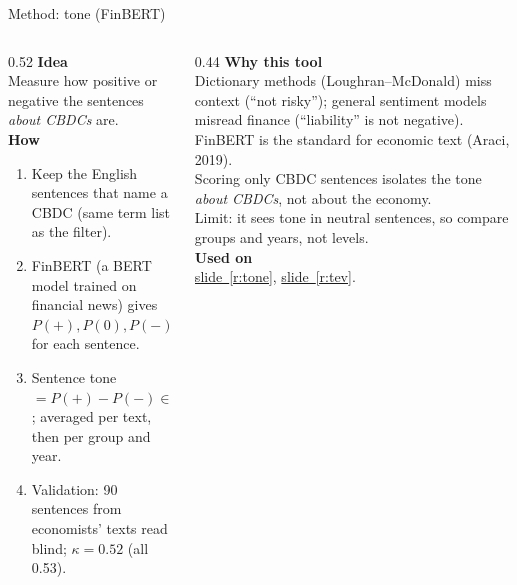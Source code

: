 \documentclass[aspectratio=169,10pt]{beamer}
\newcommand{\usedon}[1]{\hyperref[#1]{\textcolor{c4}{slide~\ref*{#1}}}}
\newcommand{\mhead}[1]{\textcolor{c1}{\textbf{#1}}\\[1pt]}
\begin{document}
\begin{frame}{Method: tone (FinBERT)}
\begin{columns}[T]
\begin{column}{0.52\textwidth}\footnotesize
\mhead{Idea}
Measure how positive or negative the sentences \emph{about CBDCs} are.\\[4pt]
\mhead{How}
\begin{enumerate}\setlength\itemsep{1pt}
\item Keep the English sentences that name a CBDC (same term list as the filter).
\item FinBERT (a BERT model trained on financial news) gives $P(+), P(0), P(-)$ for each sentence.
\item Sentence tone $= P(+) - P(-) \in[-1,1]$; averaged per text, then per group and year.
\item Validation: 90 sentences from economists' texts read blind; $\kappa = 0.52$ (all 0.53).
\end{enumerate}
\end{column}
\begin{column}{0.44\textwidth}\footnotesize
\mhead{Why this tool}
Dictionary methods (Loughran--McDonald) miss context (``not risky''); general sentiment models misread finance (``liability'' is not negative). FinBERT is the standard for economic text (Araci, 2019).\\[3pt]
Scoring only CBDC sentences isolates the tone \emph{about CBDCs}, not about the economy.\\[3pt]
Limit: it sees tone in neutral sentences, so compare groups and years, not levels.\\[6pt]
\mhead{Used on}
\usedon{r:tone}, \usedon{r:tev}.
\end{column}
\end{columns}
\end{frame}
\end{document}
